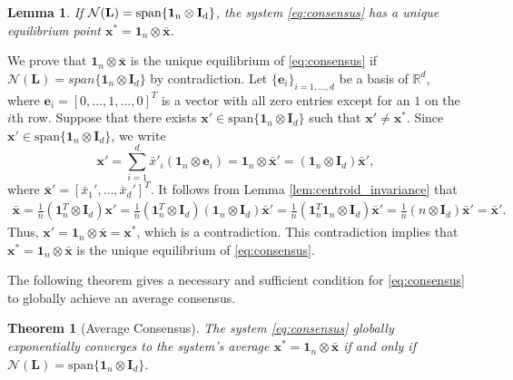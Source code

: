 \documentclass[draftclsnofoot,11pt,onecolumn]{IEEEtran}
\newtheorem{Theorem}{Theorem}
\newtheorem{Lemma}{Lemma}
\newcommand{\m}[1]{\mathbf{#1}}
\newcommand{\mc}[1]{\mathcal{#1}}
\newcommand{\mb}[1]{\mathbb{#1}}
\begin{document}
\begin{Lemma} \label{lem:unique_eq_pt} If $\mc{N}(\m{L}) = \rm{span}\{\m{1}_n \otimes \m{I}_{d}\}$, the system \eqref{eq:consensus} has a unique equilibrium point $\m{x}^* = \m{1}_n \otimes \bar{\m{x}}$.
\end{Lemma}
\begin{IEEEproof} We prove that $\m{1}_n \otimes \bar{\m{x}}$ is the unique equilibrium of \eqref{eq:consensus} if $\mc{N}(\m{L})= span\{\m{1}_n \otimes \m{I}_{d}\}$ by contradiction. Let $\{\m{e}_i\}_{i =1, \ldots, d}$ be a basis of $\mb{R}^d$, where $\m{e}_i = [0, \ldots, 1, \ldots, 0]^T$ is a vector with all zero entries except for an $1$ on the $i$th row. Suppose that there exists $\m{x}' \in \text{span} \{ \m{1}_n \otimes \m{I}_{d} \}$ such that $\m{x}' \neq \m{x}^*$. Since $\m{x}' \in \text{span} \{ \m{1}_n \otimes \m{I}_{d} \}$, we write
$$\m{x}' = \sum_{i=1}^d \bar{x}'_i (\m{1}_n \otimes \m{e}_i) = \m{1}_n \otimes \bar{\m{x}}' = (\m{1}_n \otimes \m{I}_{d})\bar{\m{x}}',$$
where $\bar{\m{x}}' = [\bar{x}_1', \ldots, \bar{x}_d']^T$. It follows from Lemma \ref{lem:centroid_invariance} that
\begin{align*}
\bar{\m{x}} = \frac{1}{n} (\m{1}_n^T \otimes \m{I}_{d}) \m{x}'   = \frac{1}{n} (\m{1}_n^T \otimes \m{I}_{d}) (\m{1}_n \otimes \m{I}_{d})\m{\bar{x}}'= \frac{1}{n} (\m{1}_n^T\m{1}_n \otimes \m{I}_{d}) \m{\bar{x}}' = \frac{1}{n} (n \otimes \m{I}_{d}) \m{\bar{x}}'  = \m{\bar{x}}'.
\end{align*}
Thus, $\m{x}' = \m{1}_n \otimes \bar{\m{x}} = \m{x}^*$, which is a contradiction. This contradiction implies that $\m{x}^* = \m{1}_n \otimes \bar{\m{x}}$ is the unique equilibrium of \eqref{eq:consensus}.
\end{IEEEproof}

The following theorem gives a necessary and sufficient condition for \eqref{eq:consensus} to globally achieve an average consensus.

\begin{Theorem}[Average Consensus] \label{thm:consensus_condition} The system \eqref{eq:consensus} globally exponentially converges to the system's average  $\m{x}^*=\m{1}_n\otimes \bar{\m{x}}$ if and only if $\mc{N}(\m{L}) = \text{span}\{\m{1}_n \otimes \m{I}_{d}\}$.
\end{Theorem}
\end{document}

